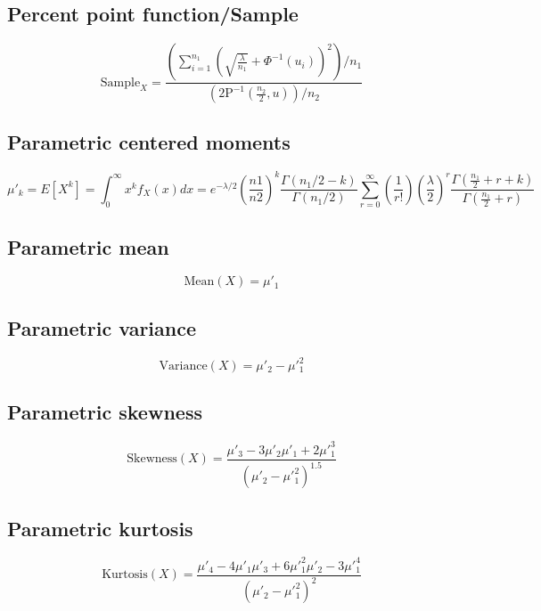 \documentclass{article}
\begin{document}
\subsection{Percent point function/Sample}
\begin{equation*} \text{Sample}_{X}=\frac{\left(\sum_{i=1}^{n_1}\left(\sqrt{\frac{\lambda}{n_1}}+\Phi^{-1}\left(u_{i}\right)\right)^{2}\right)/n_1}{\left(2\text{P}^{-1}\left(\frac{n_2}{2},u\right)\right)/n_2} \end{equation*}
\subsection{Parametric centered moments}
\begin{equation*} \mu'_{k}=E[X^k]=\int_{0}^{\infty}x^{k}f_{X}\left(x\right)dx=e^{-\lambda/2}\left(\frac{n1}{n2}\right)^{k}\frac{\Gamma\left(n_1/2-k\right)}{\Gamma\left(n_1/2\right)}\sum_{r=0}^{\infty }\left(\frac{1}{r!}\right)\left(\frac{\lambda}{2}\right)^{r}\frac{\Gamma\left(\frac{n_1}{2}+r+k\right)}{\Gamma\left(\frac{n_1}{2}+r\right)} \end{equation*}
\subsection{Parametric mean}
\begin{equation*} \mathrm{Mean}(X)=\mu'_{1} \end{equation*}
\subsection{Parametric variance}
\begin{equation*} \mathrm{Variance}(X)=\mu'_{2}-\mu'^{2}_{1} \end{equation*}
\subsection{Parametric skewness}
\begin{equation*} \mathrm{Skewness}(X)=\frac{\mu'_{3}-3\mu'_{2}\mu'_{1}+2\mu'^{3}_{1}}{(\mu'_{2}-\mu'^{2}_{1})^{1.5}} \end{equation*}
\subsection{Parametric kurtosis}
\begin{equation*} \mathrm{Kurtosis}(X)=\frac{\mu'_{4}-4\mu'_{1}\mu'_{3}+6\mu'^{2}_{1}\mu'_{2}-3\mu'^{4}_{1}}{(\mu'_{2}-\mu'^{2}_{1})^{2}} \end{equation*}
\end{document}
